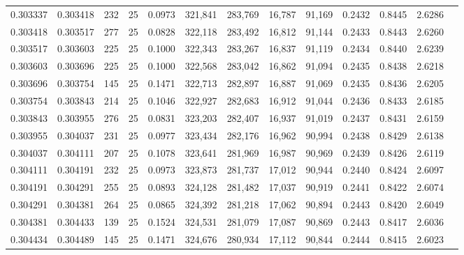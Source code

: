 \begin{tabular}{rrrrrrrrrrrrr}
0.303337 & 0.303418 &   232 &  25 &                                     0.0973 & 321,841 & 283,769 &  16,787 &  91,169 & 0.2432 & 0.8445 & 2.6286 \\
0.303418 & 0.303517 &   277 &  25 &                                     0.0828 & 322,118 & 283,492 &  16,812 &  91,144 & 0.2433 & 0.8443 & 2.6260 \\
0.303517 & 0.303603 &   225 &  25 &                                     0.1000 & 322,343 & 283,267 &  16,837 &  91,119 & 0.2434 & 0.8440 & 2.6239 \\
0.303603 & 0.303696 &   225 &  25 &                                     0.1000 & 322,568 & 283,042 &  16,862 &  91,094 & 0.2435 & 0.8438 & 2.6218 \\
0.303696 & 0.303754 &   145 &  25 &                                     0.1471 & 322,713 & 282,897 &  16,887 &  91,069 & 0.2435 & 0.8436 & 2.6205 \\
0.303754 & 0.303843 &   214 &  25 &                                     0.1046 & 322,927 & 282,683 &  16,912 &  91,044 & 0.2436 & 0.8433 & 2.6185 \\
0.303843 & 0.303955 &   276 &  25 &                                     0.0831 & 323,203 & 282,407 &  16,937 &  91,019 & 0.2437 & 0.8431 & 2.6159 \\
0.303955 & 0.304037 &   231 &  25 &                                     0.0977 & 323,434 & 282,176 &  16,962 &  90,994 & 0.2438 & 0.8429 & 2.6138 \\
0.304037 & 0.304111 &   207 &  25 &                                     0.1078 & 323,641 & 281,969 &  16,987 &  90,969 & 0.2439 & 0.8426 & 2.6119 \\
0.304111 & 0.304191 &   232 &  25 &                                     0.0973 & 323,873 & 281,737 &  17,012 &  90,944 & 0.2440 & 0.8424 & 2.6097 \\
0.304191 & 0.304291 &   255 &  25 &                                     0.0893 & 324,128 & 281,482 &  17,037 &  90,919 & 0.2441 & 0.8422 & 2.6074 \\
0.304291 & 0.304381 &   264 &  25 &                                     0.0865 & 324,392 & 281,218 &  17,062 &  90,894 & 0.2443 & 0.8420 & 2.6049 \\
0.304381 & 0.304433 &   139 &  25 &                                     0.1524 & 324,531 & 281,079 &  17,087 &  90,869 & 0.2443 & 0.8417 & 2.6036 \\
0.304434 & 0.304489 &   145 &  25 &                                     0.1471 & 324,676 & 280,934 &  17,112 &  90,844 & 0.2444 & 0.8415 & 2.6023 \\

\end{tabular}
